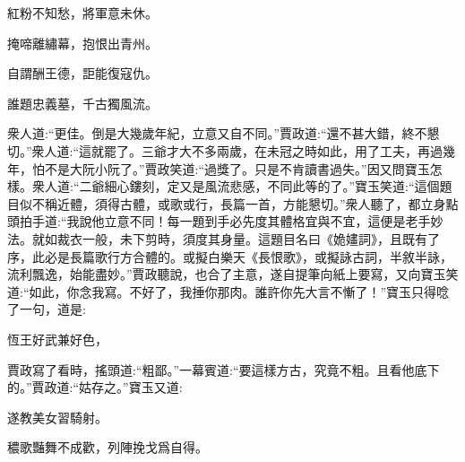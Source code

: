 \begin{poem}
    \begin{pl}紅粉不知愁，將軍意未休。\end{pl}

    \begin{pl}掩啼離繡幕，抱恨出青州。\end{pl}

    \begin{pl}自謂酬王德，詎能復寇仇。\end{pl}

    \begin{pl}誰題忠義墓，千古獨風流。\end{pl}


\end{poem}


\begin{parag}
    衆人道:“更佳。倒是大幾歲年紀，立意又自不同。”賈政道:“還不甚大錯，終不懇切。”衆人道:“這就罷了。三爺才大不多兩歲，在未冠之時如此，用了工夫，再過幾年，怕不是大阮小阮了。”賈政笑道:“過獎了。只是不肯讀書過失。”因又問寶玉怎樣。衆人道:“二爺細心鏤刻，定又是風流悲感，不同此等的了。”寶玉笑道:“這個題目似不稱近體，須得古體，或歌或行，長篇一首，方能懇切。”衆人聽了，都立身點頭拍手道:“我說他立意不同！每一題到手必先度其體格宜與不宜，這便是老手妙法。就如裁衣一般，未下剪時，須度其身量。這題目名曰《姽嫿詞》，且既有了序，此必是長篇歌行方合體的。或擬白樂天《長恨歌》，或擬詠古詞，半敘半詠，流利飄逸，始能盡妙。”賈政聽說，也合了主意，遂自提筆向紙上要寫，又向寶玉笑道:“如此，你念我寫。不好了，我捶你那肉。誰許你先大言不慚了！”寶玉只得唸了一句，道是:
\end{parag}


\begin{poem}
    \begin{pl}恆王好武兼好色，\end{pl}
\end{poem}


\begin{parag}
    賈政寫了看時，搖頭道:“粗鄙。”一幕賓道:“要這樣方古，究竟不粗。且看他底下的。”賈政道:“姑存之。”寶玉又道:
\end{parag}


\begin{poem}
    \begin{pl}遂教美女習騎射。\end{pl}

    \begin{pl}穠歌豔舞不成歡，列陣挽戈爲自得。\end{pl}


\end{poem}


